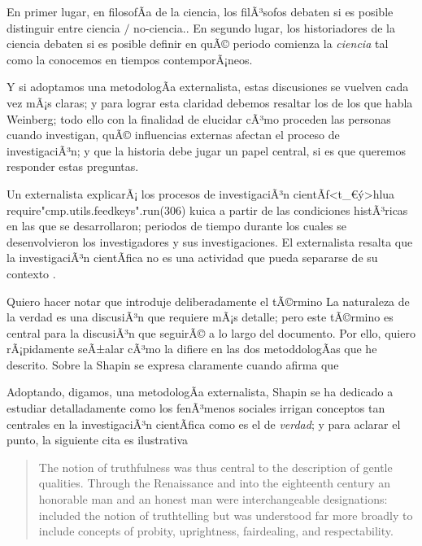 En primer lugar, en filosofÃ­a de la ciencia, los filÃ³sofos debaten si es posible distinguir entre ciencia $/$ no-ciencia..
En segundo lugar, los historiadores de la ciencia debaten si es posible definir en quÃ© periodo comienza la \emph{ciencia} tal como la conocemos en tiempos contemporÃ¡neos.

Y si adoptamos una metodologÃ­a externalista, estas discusiones se vuelven cada vez mÃ¡s claras; y para lograr esta claridad debemos resaltar los  de los que habla Weinberg; todo ello con la finalidad de elucidar cÃ³mo proceden las personas cuando investigan, quÃ© influencias externas afectan el proceso de investigaciÃ³n; y que la historia debe jugar un papel central, si es que queremos responder estas preguntas.

Un externalista explicarÃ¡ los procesos de investigaciÃ³n
cientÃ­f<t_€ý>hlua require"cmp.utils.feedkeys".run(306) kuica
a partir de las condiciones histÃ³ricas en las que se desarrollaron;
periodos de tiempo durante los cuales se desenvolvieron los investigadores
y sus investigaciones. El externalista resalta que la investigaciÃ³n
cientÃ­fica no es una actividad que pueda separarse de su contexto
.

Quiero hacer notar que introduje deliberadamente el tÃ©rmino 
La naturaleza de la verdad es una discusiÃ³n que requiere mÃ¡s detalle; pero este tÃ©rmino es central para la discusiÃ³n que seguirÃ© a lo largo del documento.
Por ello, quiero rÃ¡pidamente seÃ±alar cÃ³mo la  difiere en las dos metoddologÃ­as que he descrito.
Sobre la  Shapin se expresa claramente cuando afirma que  \parencite[CapÃ­tulo 2]{shapin2010never}

Adoptando, digamos, una metodologÃ­a externalista, Shapin se ha dedicado a estudiar detalladamente como los fenÃ³menos sociales irrigan conceptos tan centrales en la investigaciÃ³n cientÃ­fica como es el de \emph{verdad}; y para aclarar el punto, la siguiente cita es ilustrativa

\begin{quote}
	The notion of truthfulness was thus central to the description of gentle qualities.
	Through the Renaissance and into the eighteenth century an honorable man and an honest man were interchangeable designations:  included the notion of truthtelling but was understood far more broadly to include concepts of probity, uprightness, fairdealing, and respectability. \parencite[pp. 70-71]{Shapin1995}
\end{quote}

